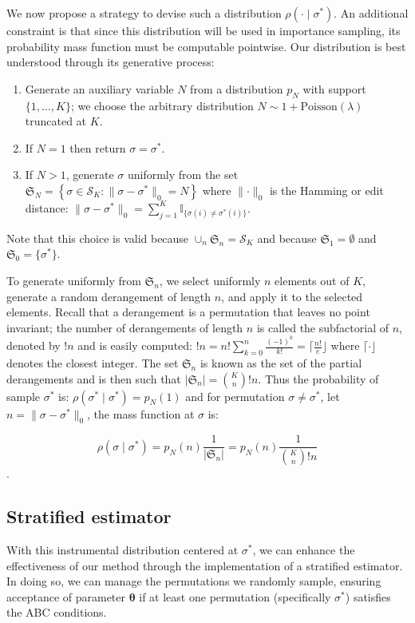 \documentclass[lineno]{biometrika}
\def\parprop{\boldsymbol{\theta}}
\begin{document}
We now propose a strategy to devise such a distribution $\rho(\cdot\mid\sigma^*)$. An additional constraint is that since this distribution will be used in importance sampling, its probability mass function must be computable pointwise. Our distribution is best understood through its generative process:

\begin{enumerate}
    \item Generate an auxiliary variable $N$ from a distribution $p_N$ with support $\{1, \ldots, K\}$; we choose the arbitrary distribution $N \sim 1 + \text{Poisson}(\lambda)$ truncated at $K$.
    \item If $N = 1$ then return $\sigma = \sigma^*$.
    \item If $N > 1$, generate $\sigma$ uniformly from the set $\mathfrak{S}_N = \left\{\sigma \in \mathcal{S}_K: \lVert \sigma - \sigma^*\rVert_0 = N\right\}$ where $\lVert \cdot \rVert_0$ is the Hamming or edit distance: $\lVert\sigma - \sigma^*\rVert_0 = \sum_{j=1}^K \mathbb{I}_{\{\sigma(i) \neq \sigma^*(i)\}}$.
\end{enumerate}

Note that this choice is valid because $\cup_n \mathfrak{S}_n = \mathcal{S}_K$ and because $\mathfrak{S}_1 = \emptyset$ and $\mathfrak{S}_0 = \{\sigma^*\}$. 

To generate uniformly from $\mathfrak S_n$, we select uniformly $n$ elements out of $K$, generate a random derangement of length $n$, and apply it to the selected elements. Recall that a derangement is a permutation that leaves no point invariant; the number of derangements of length $n$ is called the subfactorial of $n$, denoted by $!n$ and is easily computed: $!n = n! \sum_{k=0}^n \frac{(-1)^k}{k!} = \lceil \frac{n!}{e} \rfloor$ where $\lceil \cdot \rfloor$ denotes the closest integer.
The set $\mathfrak{S}_n$ is known as the set of the partial derangements and is then such that $\lvert \mathfrak S_n \rvert = \binom{K}{n} !n$. 
Thus the probability of sample $\sigma^*$ is: $\rho(\sigma^*\mid \sigma^*) = p_N(1)$ and for  permutation $\sigma \neq \sigma^*$, let $n = \lVert\sigma - \sigma^*\rVert_0$,  the mass function at $\sigma$ is:

$$\rho(\sigma\mid\sigma^*) = p_N(n)\frac{1}{\lvert \mathfrak{S}_n \rvert} = p_N(n)\frac{1}{\binom{K}{n}!n}$$.

\subsection{Stratified estimator}
\label{appendix_secstrat}
With this instrumental distribution centered at $\sigma^*$, we can enhance the effectiveness of our method through the implementation of a stratified estimator. In doing so, we can manage the permutations we randomly sample, ensuring acceptance of parameter $\parprop$ if at least one permutation (specifically $\sigma^*$) satisfies the ABC conditions.
\end{document}
